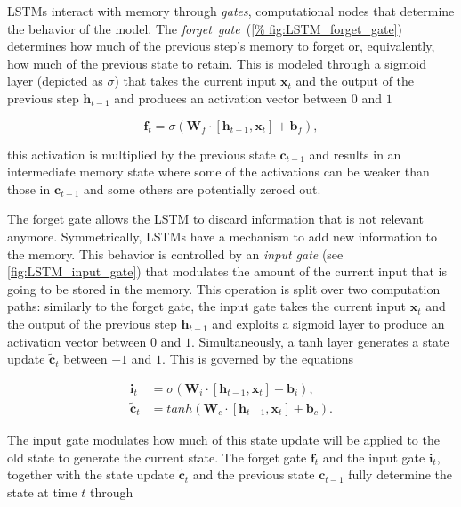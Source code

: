 LSTMs interact with memory through \emph{gates}, computational nodes that
determine the behavior of the model. The \emph{forget~gate}~(\autoref{%
fig:LSTM_forget_gate}) determines how much of the previous step's memory to
forget or, equivalently, how much of the previous state to retain.  This is
modeled through a sigmoid layer (depicted as $\sigma$) that takes the current
input $\mathbf{x}_t$ and the output of the previous step $\mathbf{h}_{t-1}$ and
produces an activation vector between $0$ and $1$

\begin{equation}\label{eq:LSTM_forget_gate}
    \mathbf{f}_t = \sigma\left(\mathbf{W}_f \cdot \left[\mathbf{h}_{t-1},
        \mathbf{x}_t\right] + \mathbf{b}_f \right),
\end{equation}

\noindent this activation is multiplied by the previous state
$\mathbf{c}_{t-1}$ and results in an intermediate memory state where some of
the activations can be weaker than those in $\mathbf{c}_{t-1}$ and some others
are potentially zeroed out.

The forget gate allows the LSTM to discard information that is not relevant
anymore. Symmetrically, LSTMs have a mechanism to add new information to the
memory. This behavior is controlled by an \emph{input gate} (see
\autoref{fig:LSTM_input_gate}) that modulates the amount of the current input
that is going to be stored in the memory. This operation is split over two
computation paths: similarly to the forget gate, the input gate takes the
current input $\mathbf{x}_t$ and the output of the previous step
$\mathbf{h}_{t-1}$ and exploits a sigmoid layer to produce an activation vector
between $0$ and $1$.  Simultaneously, a tanh layer generates a state update
$\mathbf{\tilde c}_t$ between $-1$ and $1$. This is governed by the equations

\begin{equation}\label{eq:LSTM_input_gate}
\begin{split}
    \mathbf{i}_t &= \sigma\left(\mathbf{W}_i \cdot \left[\mathbf{h}_{t-1},
        \mathbf{x}_t\right] + \mathbf{b}_i \right),\\
    \mathbf{\tilde c}_t &= tanh \left(\mathbf{W}_c \cdot
        \left[\mathbf{h}_{t-1}, \mathbf{x}_t\right] + \mathbf{b}_c \right).
\end{split}
\end{equation}

The input gate modulates how much of this state update will be applied to the
old state to generate the current state. The forget gate $\mathbf{f}_t$ and the
input gate $\mathbf{i}_t$, together with the state update $\mathbf{\tilde c}_t$
and the previous state $\mathbf{c}_{t-1}$ fully determine the state at time $t$
through

